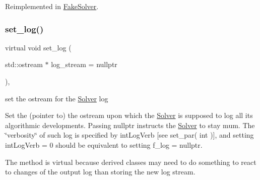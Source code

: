 Reimplemented in \mbox{\hyperlink{class_s_m_spp__di__unipi__it_1_1_fake_solver_a8d7fb698416759f38941e06b23cccaec}{Fake\+Solver}}.

\mbox{\label{class_s_m_spp__di__unipi__it_1_1_solver_aba02e3287c6c72bbacb555295168d0e8}} 
\subsubsection{\texorpdfstring{set\+\_\+log()}{set\_log()}}
{\footnotesize\ttfamily virtual void set\+\_\+log (\begin{DoxyParamCaption}\item[{std\+::ostream $\ast$}]{log\+\_\+stream = {\ttfamily nullptr} }\end{DoxyParamCaption})\hspace{0.3cm}{\ttfamily [inline]}, {\ttfamily [virtual]}}



set the ostream for the \mbox{\hyperlink{class_s_m_spp__di__unipi__it_1_1_solver}{Solver}} log 

Set the (pointer to) the ostream upon which the \mbox{\hyperlink{class_s_m_spp__di__unipi__it_1_1_solver}{Solver}} is supposed to log all its algorithmic developments. Passing nullptr instructs the \mbox{\hyperlink{class_s_m_spp__di__unipi__it_1_1_solver}{Solver}} to stay mum. The \char`\"{}verbosity\char`\"{} of such log is specified by int\+Log\+Verb \mbox{[}see set\+\_\+par( int )\mbox{]}, and setting int\+Log\+Verb = 0 should be equivalent to setting f\+\_\+log = nullptr.

The method is virtual because derived classes may need to do something to react to changes of the output log than storing the new log stream. \mbox{\label{class_s_m_spp__di__unipi__it_1_1_solver_ae1717d1363782e086aa797e7437c0352}} 
